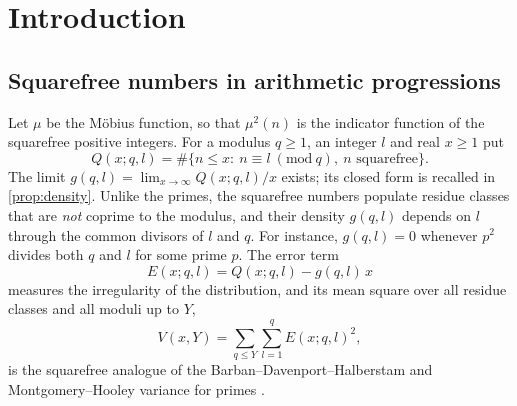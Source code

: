 \chapter{Introduction}\label{ch:intro}

\section{Squarefree numbers in arithmetic progressions}

Let $\mu$ be the Möbius function, so that $\mu^2(n)$ is the indicator function of the squarefree positive integers. For a modulus $q\ge1$, an integer $l$ and real $x\ge1$ put
\[
Q(x;q,l)=\#\{n\le x:\ n\equiv l\ (\mathrm{mod}\ q),\ n\text{ squarefree}\}.
\]
The limit $g(q,l)=\lim_{x\to\infty}Q(x;q,l)/x$ exists; its closed form is recalled in \cref{prop:density}. Unlike the primes, the squarefree numbers populate residue classes that are \emph{not} coprime to the modulus, and their density $g(q,l)$ depends on $l$ through the common divisors of $l$ and $q$. For instance, $g(q,l)=0$ whenever $p^2$ divides both $q$ and $l$ for some prime $p$. The error term
\[
E(x;q,l)=Q(x;q,l)-g(q,l)\,x
\]
measures the irregularity of the distribution, and its mean square over all residue classes and all moduli up to $Y$,
\[
V(x,Y)=\sum_{q\le Y}\sum_{l=1}^{q}E(x;q,l)^2,
\]
is the squarefree analogue of the Barban--Davenport--Halberstam and Montgomery--Hooley variance for primes \cite{montgomery1970,hooley1975i}.

